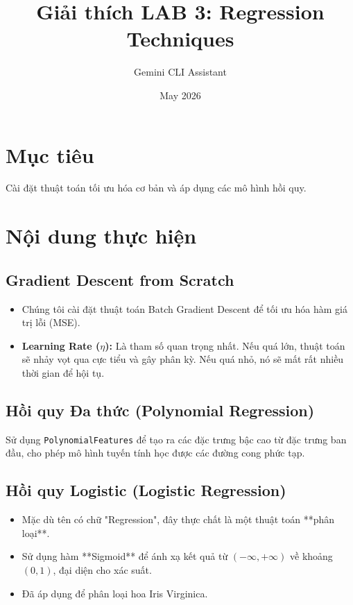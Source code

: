 \documentclass{article}
\title{Giải thích LAB 3: Regression Techniques}
\author{Gemini CLI Assistant}
\date{May 2026}
\begin{document}
\maketitle

\section{Mục tiêu}
Cài đặt thuật toán tối ưu hóa cơ bản và áp dụng các mô hình hồi quy.

\section{Nội dung thực hiện}

\subsection{Gradient Descent from Scratch}
\begin{itemize}
    \item Chúng tôi cài đặt thuật toán Batch Gradient Descent để tối ưu hóa hàm giá trị lỗi (MSE).
    \item \textbf{Learning Rate ($\eta$):} Là tham số quan trọng nhất. Nếu quá lớn, thuật toán sẽ nhảy vọt qua cực tiểu và gây phân kỳ. Nếu quá nhỏ, nó sẽ mất rất nhiều thời gian để hội tụ.
\end{itemize}

\subsection{Hồi quy Đa thức (Polynomial Regression)}
Sử dụng \texttt{PolynomialFeatures} để tạo ra các đặc trưng bậc cao từ đặc trưng ban đầu, cho phép mô hình tuyến tính học được các đường cong phức tạp.

\subsection{Hồi quy Logistic (Logistic Regression)}
\begin{itemize}
    \item Mặc dù tên có chữ "Regression", đây thực chất là một thuật toán **phân loại**.
    \item Sử dụng hàm **Sigmoid** để ánh xạ kết quả từ $(-\infty, +\infty)$ về khoảng $(0, 1)$, đại diện cho xác suất.
    \item Đã áp dụng để phân loại hoa Iris Virginica.
\end{itemize}
\end{document}
